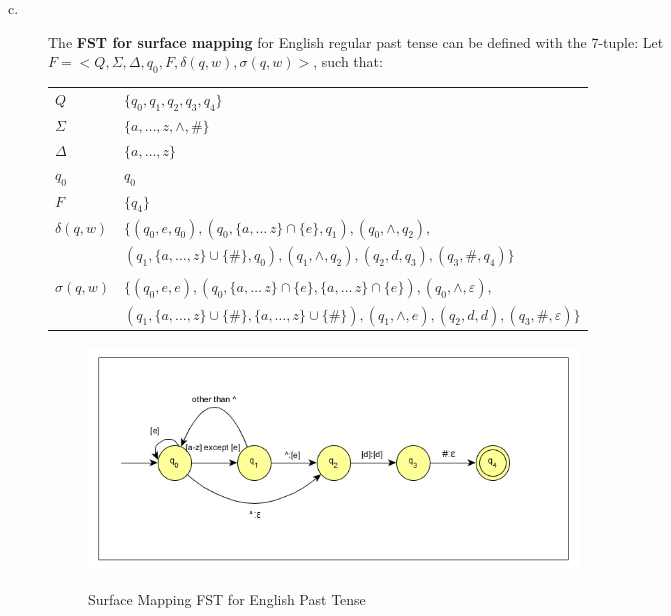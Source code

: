 \documentclass[11pt]{article}
\begin{document}
\begin{solution}
\begin{description}
	\item[c.] The \textbf{FST for surface mapping} for English regular past tense can be defined with the 7-tuple:
	Let $F = <Q, \Sigma, \Delta, q_{0}, F, \delta(q, w), \sigma(q, w)>$, such that:

	\begin{tabular}{l | l}
		$Q$ & $\{ q_{0}, q_{1}, q_{2}, q_{3}, q_{4}\}$ \\
		$\Sigma$ & $\{a, \ldots, z, \wedge, \# \}$ \\
		$\Delta$ & $\{a, \ldots, z\}$ \\
		$q_{0}$ & $q_{0}$ \\
		$F$ & $\{ q_{4} \}$ \\
		$\delta(q, w)$ &  $\{(q_{0},e,q_{0}), (q_{0}, \{a, \ldots\, z\} \cap \{e\}, q_{1}), (q_{0},\wedge, q_{2}), $ \\
		 &  $(q_{1},\{a, \ldots, z\} \cup \{\#\},q_{0}), (q_{1}, \wedge , q_{2}), (q_{2}, d, q_{3}), (q_{3}, \#, q_{4})\}$\\
		 & \\
		$\sigma(q, w)$ & $\{(q_{0},e,e), (q_{0}, \{a, \ldots\, z\} \cap \{e\},\{a, \ldots\, z\} \cap \{e\}), (q_{0},\wedge, \varepsilon), $ \\
		 &  $(q_{1},\{a, \ldots, z\} \cup \{\#\},\{a, \ldots, z\} \cup \{\#\}), (q_{1}, \wedge , e), (q_{2}, d, d), (q_{3}, \#, \varepsilon)\}$\\
	\end{tabular}

	\begin{figure}[h]
		\centering
		\includegraphics[width=13cm, height=6cm]{problem07partc} \\
		\caption{Surface Mapping FST for English Past Tense}
	\end{figure}

\end{description}

\end{solution}
\end{document}
